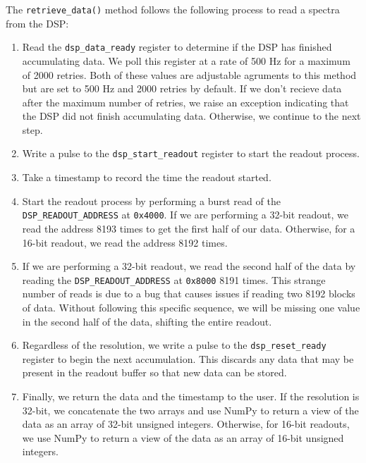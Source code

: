 The \texttt{retrieve\_data()} method follows the following process to read a spectra from the DSP:
\begin{enumerate}
    \item 
        Read the \texttt{dsp\_data\_ready} register to determine if the DSP has finished accumulating data.
        We poll this register at a rate of 500 Hz for a maximum of 2000 retries. 
        Both of these values are adjustable agruments to this method but are set to 500 Hz and 2000 retries by default.
        If we don't recieve data after the maximum number of retries, we raise an exception indicating that the DSP did not finish accumulating data.
        Otherwise, we continue to the next step.
    \item 
        Write a pulse to the \texttt{dsp\_start\_readout} register to start the readout process. 
    \item  
        Take a timestamp to record the time the readout started.
    \item 
        Start the readout process by performing a burst read of the \texttt{DSP\_READOUT\_ADDRESS} at \texttt{0x4000}. 
        If we are performing a 32-bit readout, we read the address 8193 times to get the first half of our data. 
        Otherwise, for a 16-bit readout, we read the address 8192 times.
    \item 
        If we are performing a 32-bit readout, we read the second half of the data by reading the \texttt{DSP\_READOUT\_ADDRESS} at \texttt{0x8000} 8191 times.
        This strange number of reads is due to a bug that causes issues if reading two 8192 blocks of data.
        Without following this specific sequence, we will be missing one value in the second half of the data, shifting the entire readout. 
    \item 
        Regardless of the resolution, we write a pulse to the \texttt{dsp\_reset\_ready} register to begin the next accumulation.
        This discards any data that may be present in the readout buffer so that new data can be stored. 
    \item 
        Finally, we return the data and the timestamp to the user. 
        If the resolution is 32-bit, we concatenate the two arrays and use NumPy to return a view of the data as an array of 32-bit unsigned integers.
        Otherwise, for 16-bit readouts, we use NumPy to return a view of the data as an array of 16-bit unsigned integers.
\end{enumerate}

